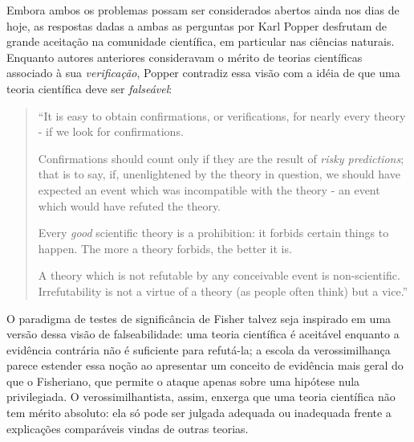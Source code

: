 Embora ambos os problemas possam ser considerados abertos ainda nos dias de hoje,
as respostas dadas a ambas as perguntas por Karl Popper desfrutam de grande aceitação na comunidade científica, em particular
nas ciências naturais. 
Enquanto autores anteriores consideravam o mérito de teorias científicas associado à sua {\em verificação}, Popper
contradiz essa visão com a idéia de que uma teoria científica deve ser {\em falseável}:

\begin{quote}
``It is easy to obtain confirmations, or verifications, for nearly every theory - if we look for confirmations.

Confirmations should count only if they are the result of {\em risky predictions}; that is to say, if, unenlightened by 
the theory in question, we should have expected an event which was incompatible with the theory - an 
event which would have refuted the theory.

Every {\em good} scientific theory is a prohibition: it forbids certain things to happen. The more a theory forbids, the 
better it is.

A theory which is not refutable by any conceivable event is non-scientific. Irrefutability is not a virtue of a 
theory (as people often think) but a vice.'' \citep{Popper63}
\end{quote}

O paradigma de testes de significância de Fisher talvez seja inspirado em uma versão dessa visão de falseabilidade: uma
teoria científica é aceitável enquanto a evidência contrária não é
suficiente para refutá-la; 
a escola da verossimilhança
parece estender essa noção ao apresentar um conceito de evidência mais geral do que o Fisheriano, que permite o ataque apenas
sobre uma hipótese nula privilegiada. O verossimilhantista, assim, enxerga que uma teoria científica não tem mérito absoluto:
ela só pode ser julgada adequada ou inadequada frente a explicações comparáveis vindas de outras teorias.

